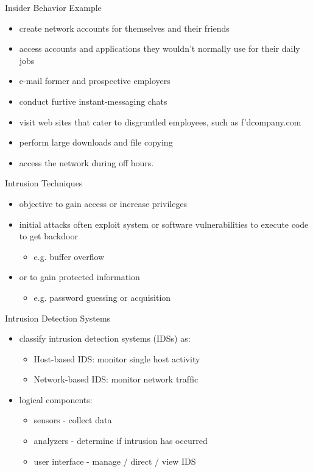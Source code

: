 \documentclass{beamer}
\begin{document}
\begin{frame}{Insider Behavior Example}
  \begin{itemize}
  \item create network accounts for themselves and their 
    friends
  \item access accounts and applications they wouldn't 
    normally use for their daily jobs
  \item e-mail former and prospective employers
  \item conduct furtive instant-messaging chats
  \item visit web sites that cater to disgruntled 
    employees, such as f'dcompany.com
  \item perform large downloads and ﬁle copying
  \item access the network during off hours.
  \end{itemize}
\end{frame}

\begin{frame}{Intrusion Techniques}
  \begin{itemize}
  \item objective to gain access or increase privileges
  \item initial attacks often exploit system or software 
    vulnerabilities to execute code to get backdoor
      \begin{itemize}
      \item e.g. buffer overflow 
      \end{itemize}
  \item or to gain protected information 
      \begin{itemize}
      \item e.g. password guessing or acquisition
      \end{itemize}
  \end{itemize}
\end{frame}


\begin{frame}{Intrusion Detection Systems}
  \begin{itemize}
    \item classify intrusion detection systems (IDSs) as:
      \begin{itemize}
      \item Host-based IDS: monitor single host activity
      \item Network-based IDS: monitor network trafﬁc
      \end{itemize}
    \item logical components:
      \begin{itemize}
      \item sensors - collect data
      \item analyzers - determine if intrusion has occurred
      \item user interface - manage / direct / view IDS
      \end{itemize}
  \end{itemize}
\end{frame}
\end{document}
